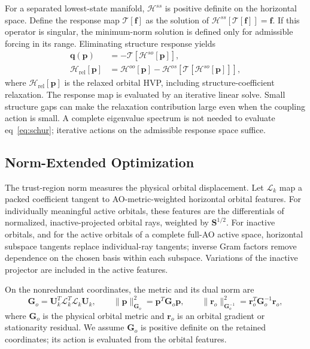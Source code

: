 \documentclass[12pt]{article}
\begin{document}
For a separated lowest-state manifold, \(\mathcal H^{ss}\) is positive definite on the horizontal space. Define the response map \(\mathcal T[\mathbf f]\) as the solution of \(\mathcal H^{ss}[\mathcal T[\mathbf f]]=\mathbf f\). If this operator is singular, the minimum-norm solution is defined only for admissible forcing in its range. Eliminating structure response yields
\begin{equation}
 \begin{aligned}
 \mathbf q(\mathbf p)&=-\mathcal T[\mathcal H^{so}[\mathbf p]],\\
 \mathcal H_{\mathrm{rel}}[\mathbf p]
 &=\mathcal H^{oo}[\mathbf p]-\mathcal H^{os}[\mathcal T[\mathcal H^{so}[\mathbf p]]],
 \end{aligned}
 \label{eq:schur}
\end{equation}
where \(\mathcal H_{\mathrm{rel}}[\mathbf p]\) is the relaxed orbital HVP, including structure-coefficient relaxation. The response map is evaluated by an iterative linear solve. Small structure gaps can make the relaxation contribution large even when the coupling action is small. A complete eigenvalue spectrum is not needed to evaluate eq~\eqref{eq:schur}; iterative actions on the admissible response space suffice.

\subsection{Norm-Extended Optimization}

The trust-region norm measures the physical orbital displacement. Let \(\mathcal L_k\) map a packed coefficient tangent to AO-metric-weighted horizontal orbital features. For individually meaningful active orbitals, these features are the differentials of normalized, inactive-projected orbital rays, weighted by \(\mathbf S^{1/2}\). For inactive orbitals, and for the active orbitals of a complete full-AO active space, horizontal subspace tangents replace individual-ray tangents; inverse Gram factors remove dependence on the chosen basis within each subspace. Variations of the inactive projector are included in the active features.

On the nonredundant coordinates, the metric and its dual norm are
\begin{equation}
 \mathbf G_o=\mathbf U_k^T\mathcal L_k^T\mathcal L_k\mathbf U_k,
 \qquad \|\mathbf p\|_{\mathbf G_o}^2=\mathbf p^T\mathbf G_o\mathbf p,
 \qquad \|\mathbf r_o\|_{\mathbf G_o^{-1}}^2
 =\mathbf r_o^T\mathbf G_o^{-1}\mathbf r_o,
 \label{eq:metric}
\end{equation}
where \(\mathbf G_o\) is the physical orbital metric and \(\mathbf r_o\) is an orbital gradient or stationarity residual. We assume \(\mathbf G_o\) is positive definite on the retained coordinates; its action is evaluated from the orbital features.
\end{document}
